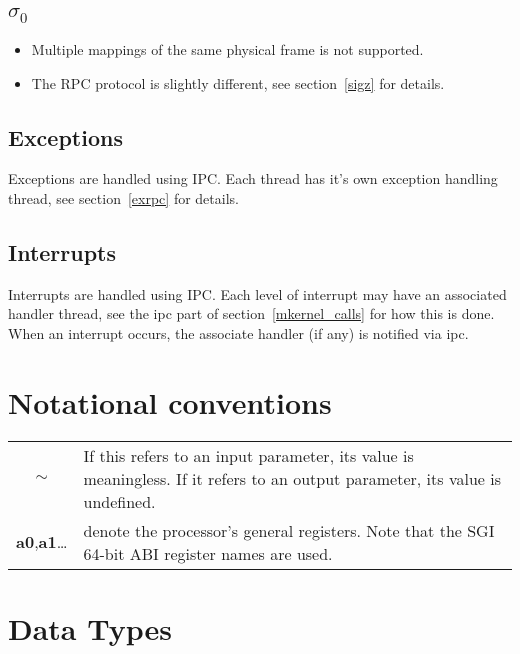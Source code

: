\documentclass[a4paper,11pt,twoside,dvips]{book}
\newcommand{\undef}{$\sim$}
\newcommand{\reg}[1]{\mbox{\textbf{#1}}}
\newcommand{\sigz}{\mbox{$\sigma_{0}$}}
\begin{document}
\subsection{\sigz}

\begin{itemize}
\item Multiple mappings of the same physical frame is not supported.
\item The RPC protocol is slightly different, see section~\ref{sigz} for
  details.
\end{itemize}
 

\subsection{Exceptions}

Exceptions are handled using IPC. Each thread has it's own exception
handling thread, see section~\ref{exrpc} for details.

\cbstart
\subsection{Interrupts}

Interrupts are handled using IPC. Each level of interrupt may have an
associated handler thread, see the ipc part of
section~\ref{mkernel_calls} for how this is done. When an interrupt
occurs, the associate handler (if any) is notified via ipc.
\cbend

\section{Notational conventions} 
 
\vspace{30pt} 
\begin{center}\begin{tabular}{cp{200pt}} 
% 
\undef                & If this refers to an input parameter, its value is
                        meaningless. If it refers to an output parameter,
                        its value is undefined.\\[10pt] 
% 
                        \reg{a0},\reg{a1}\dots & denote the processor's
                        general registers. Note that the SGI 64-bit ABI register names are used.\\[10pt] 
% 
\end{tabular}\end{center} 
 
 
\section{Data Types} 
 
\end{document}
